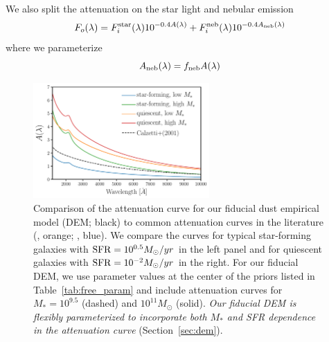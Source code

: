 We also split the attenuation on the star light and nebular emission 
\begin{equation} 
    F_o (\lambda) = F^{\rm star}_i (\lambda) 10^{-0.4 A(\lambda)} + F^{\rm
    neb}_i (\lambda) 10^{-0.4 A_{\rm neb}(\lambda)}
\end{equation}
where we parameterize
\begin{equation}
    A_{\rm neb}(\lambda) = f_{\rm neb}  A(\lambda) 
\end{equation} 


\begin{figure}
\begin{center}
    \includegraphics[width=0.6\textwidth]{figs/dems.pdf}
    \caption{Comparison of the attenuation curve for our fiducial dust empirical
    model (DEM; black) to common attenuation curves in the
    literature (\citealt{calzetti2001}, orange; \citealt{salim2018}, blue). We compare the curves for typical 
    star-forming galaxies with ${\rm SFR}=10^{0.5}M_\odot/yr$ in the left panel
    and for quiescent galaxies with ${\rm SFR}=10^{-2}M_\odot/yr$ in the right.
    For our fiducial DEM, we use parameter values at {\color{red} the center of the priors
    listed in Table~\ref{tab:free_param}} and include attenuation curves for $M_* = 10^{9.5}$
    (dashed) and $10^{11} M_\odot$ (solid). {\em Our fiducial DEM is flexibly
    parameterized to incorporate both $M_*$ and SFR dependence in the
    attenuation curve} (Section~\ref{sec:dem}).
    } 
\label{fig:dem}
\end{center}
\end{figure}


